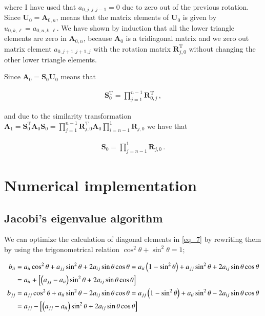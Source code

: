 \documentclass[11pt,english,a4paper]{article}
\begin{document}
\begin{flushleft}
where I have used that $a_{0,j,j,j-1}=0$ due to zero out of the previous rotation. Since $\textbf{U}_0 = \textbf{A}_{0,n}$, means that the matrix elements of $\textbf{U}_0$ is given by $u_{0,k,\ell} = a_{0,n,k,\ell}$. We have shown by induction that all the lower triangle elements are zero in $\textbf{A}_{0,n}$, because $\textbf{A}_0$ is a tridiagonal matrix and we zero out matrix element $a_{0,j+1,j+1,j}$ with the rotation matrix $\textbf{R}_{j,0}^{\text{T}}$ without changing the other lower triangle elements.\linebreak

Since $\textbf{A}_0 = \textbf{S}_0 \textbf{U}_0$ means that 

\begin{align*}
\textbf{S}_0^{\text{T}} = \prod_{j=1}^{n-1} \textbf{R}_{0,j}^{\text{T}} \,,
\end{align*}

and due to the similarity transformation $\textbf{A}_1 = \textbf{S}_0^{\text{T}} \textbf{A}_0 \textbf{S}_0 = \prod_{j=1}^{n-1}\textbf{R}_{j,0}^{\text{T}} \textbf{A}_0 \prod_{i=n-1}^{1}\textbf{R}_{j,0}$ we have that

\begin{align*}
\textbf{S}_0 = \prod_{j=n-1}^{1} \textbf{R}_{j,0} \,.
\end{align*}

\section{Numerical implementation}

\subsection{Jacobi's eigenvalue algorithm}

We can optimize the calculation of diagonal elements in \eqref{eq_7} by rewriting them by using the trigonometrical relation $\cos^2\theta+\sin^2\theta = 1$;

\begin{align}
b_{ii} &= a_{ii}\cos^2\theta + a_{jj}\sin^2\theta + 2 a_{ij}\sin\theta\cos\theta 
= a_{ii}\left({1-\sin^2\theta}\right) + a_{jj}\sin^2\theta + 2 a_{ij}\sin\theta\cos\theta
\nonumber\\
&= a_{ii} + \left[{\left({a_{jj}-a_{ii}}\right)\sin^2\theta + 2 a_{ij}\sin\theta\cos\theta}\right]
\\
b_{jj} &= a_{jj}\cos^2\theta + a_{ii}\sin^2\theta - 2a_{ij}\sin\theta\cos\theta
= a_{jj}\left({1-\sin^2\theta}\right) + a_{ii}\sin^2\theta - 2a_{ij}\sin\theta\cos\theta
\nonumber\\
&= a_{jj} - \left[{\left({a_{jj}-a_{ii}}\right)\sin^2\theta + 2a_{ij}\sin\theta\cos\theta}\right]
\end{align}


\end{flushleft}
\end{document}
